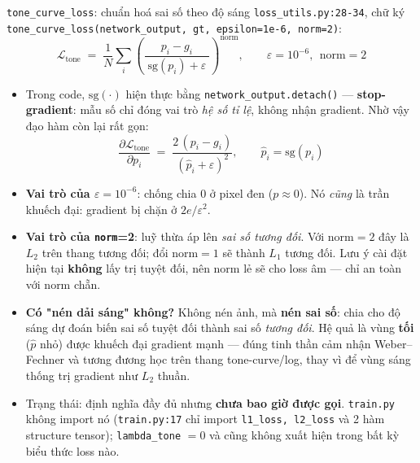 \begin{frame}{\texttt{tone\_curve\_loss}: chuẩn hoá sai số theo độ sáng}
\footnotesize
\texttt{loss\_utils.py:28-34}, chữ ký \texttt{tone\_curve\_loss(network\_output, gt, epsilon=1e-6, norm=2)}:
\[
\mathcal{L}_{\text{tone}} \;=\; \frac{1}{N}\sum_i
\left(\frac{p_i - g_i}{\;\mathrm{sg}(p_i) + \varepsilon\;}\right)^{\!\text{norm}},
\qquad \varepsilon = 10^{-6},\ \ \text{norm}=2
\]
\begin{itemize}
    \item Trong code, $\mathrm{sg}(\cdot)$ hiện thực bằng \texttt{network\_output.detach()} --- \textbf{stop-gradient}: mẫu số chỉ đóng vai trò \emph{hệ số tỉ lệ}, không nhận gradient. Nhờ vậy đạo hàm còn lại rất gọn:
    \[
    \frac{\partial \mathcal{L}_{\text{tone}}}{\partial p_i} \;=\; \frac{2\,(p_i-g_i)}{(\hat{p}_i+\varepsilon)^2},
    \qquad \hat{p}_i = \mathrm{sg}(p_i)
    \]
    \item \textbf{Vai trò của $\varepsilon=10^{-6}$}: chống chia 0 ở pixel đen ($p\approx 0$). Nó \emph{cũng} là trần khuếch đại: gradient bị chặn ở $2e/\varepsilon^2$.
    \item \textbf{Vai trò của \texttt{norm}=2}: luỹ thừa áp lên \emph{sai số tương đối}. Với norm$=2$ đây là $L_2$ trên thang tương đối; đổi norm$=1$ sẽ thành $L_1$ tương đối. Lưu ý cài đặt hiện tại \textbf{không} lấy trị tuyệt đối, nên norm lẻ sẽ cho loss âm --- chỉ an toàn với norm chẵn.
    \item \textbf{Có "nén dải sáng" không?} Không nén ảnh, mà \textbf{nén sai số}: chia cho độ sáng dự đoán biến sai số tuyệt đối thành sai số \emph{tương đối}. Hệ quả là vùng \textbf{tối} ($\hat{p}$ nhỏ) được khuếch đại gradient mạnh --- đúng tinh thần cảm nhận Weber--Fechner và tương đương học trên thang tone-curve/log, thay vì để vùng sáng thống trị gradient như $L_2$ thuần.
    \item \alert{Trạng thái:} định nghĩa đầy đủ nhưng \textbf{chưa bao giờ được gọi}. \texttt{train.py} không import nó (\texttt{train.py:17} chỉ import \texttt{l1\_loss, l2\_loss} và 2 hàm structure tensor); \texttt{lambda\_tone} $=0$ và cũng không xuất hiện trong bất kỳ biểu thức loss nào.
\end{itemize}
\end{frame}

